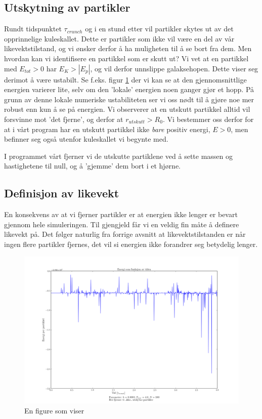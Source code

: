 \documentclass[11pt]{article}
\begin{document}
\begin{multicols}{2}
\subsection{Utskytning av partikler}
Rundt tidspunktet $\tau_{crunch}$ og i en stund etter vil partikler skytes ut
av det opprinnelige kuleskallet. Dette er partikler som ikke vil
være en del av vår likevektstilstand, og vi ønsker derfor å ha muligheten
til å se bort fra dem. Men hvordan kan vi identifisere en partikkel
som er skutt ut? Vi vet at en partikkel med $E_{tot} > 0$ har $E_K > |E_p|$, og
vil derfor unnslippe galaksehopen. Dette viser seg derimot å være ustabilt. Se
f.eks. figur \ref{fig:energivariasjon} der vi kan se at den gjennomsnittlige
energien varierer lite, selv om den 'lokale' energien noen ganger gjør et hopp.
 På grunn av denne lokale numeriske ustabiliteten ser vi oss nødt til å gjøre
noe mer robust enn kun å se på energien. Vi observerer at en utskutt 
partikkel alltid vil forsvinne mot 'det fjerne', og derfor at 
$r_{utskutt} > R_0$. Vi bestemmer oss derfor for at i vårt program har
en utskutt partikkel ikke \emph{bare} positiv energi, $E > 0$, men befinner seg også
utenfor kuleskallet vi begynte med. 

I programmet vårt fjerner vi de utskutte
partiklene ved å sette massen og hastighetene til null, og å 'gjemme' dem bort i et hjørne. 


\subsection{Definisjon av likevekt}
En konsekvens av at vi fjerner partikler er at energien ikke lenger er bevart
gjennom hele simuleringen. Til gjengjeld får vi en veldig fin måte å definere
likevekt på. Det følger naturlig fra forrige avsnitt at likevektstilstanden
er når ingen flere partikler fjernes, det vil si energien ikke forandrer seg
betydelig lenger.

\end{multicols}
\begin{figure}[!ht]
  \centering
  \includegraphics[width=\textwidth]{../fig/energivariasjon.png}
  \caption{\label{fig:energivariasjon} En figure som viser  }
\end{figure}
\end{document}
